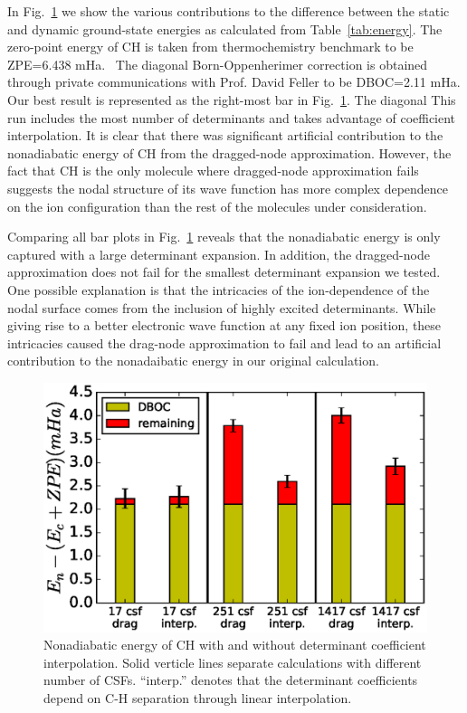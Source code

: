 \documentclass[aip,jcp,numerical,reprint]{revtex4-1}
\begin{document}
In Fig.~\ref{fig:ch-interp} we show the various contributions to the difference between the static and dynamic ground-state energies as calculated from Table~\ref{tab:energy}. The zero-point energy of CH is taken from thermochemistry benchmark to be ZPE=6.438 mHa.~\cite{Feller_Corrections} The diagonal Born-Oppenherimer correction is obtained through private communications with Prof. David Feller to be DBOC=2.11 mHa. Our best result is represented as the right-most bar in Fig.~\ref{fig:ch-interp}. The diagonal  This run includes the most number of determinants and takes advantage of coefficient interpolation. It is clear that there was significant artificial contribution to the nonadiabatic energy of CH from the dragged-node approximation. However, the fact that CH is the only molecule where dragged-node approximation fails suggests the nodal structure of its wave function has more complex dependence on the ion configuration than the rest of the molecules under consideration.

Comparing all bar plots in Fig.~\ref{fig:ch-interp} reveals that the nonadiabatic energy is only captured with a large determinant expansion. In addition, the dragged-node approximation does not fail for the smallest determinant expansion we tested. One possible explanation is that the intricacies of the ion-dependence of the nodal surface comes from the inclusion of highly excited determinants. While giving rise to a better electronic wave function at any fixed ion position, these intricacies caused the drag-node approximation to fail and lead to an artificial contribution to the nonadaibatic energy in our original calculation.

\begin{figure}[h]
\includegraphics[scale=0.5]{ch-only}
\caption{Nonadiabatic energy of CH with and without determinant coefficient interpolation. Solid verticle lines separate calculations with different number of CSFs. ``interp.'' denotes that the determinant coefficients depend on C-H separation through linear interpolation. \label{fig:ch-interp} }
\end{figure}
\end{document}
